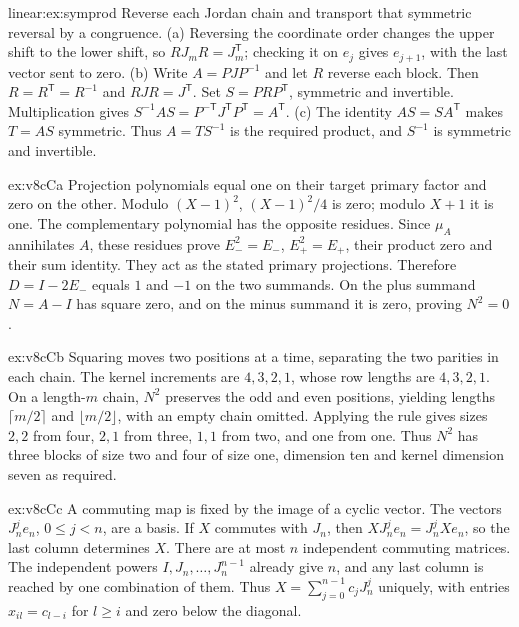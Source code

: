 \begin{solution}{linear:ex:symprod}
\idea Reverse each Jordan chain and transport that symmetric reversal by a congruence.
\writeup (a) Reversing the coordinate order changes the upper shift to the lower shift, so $RJ_mR=J_m^{\mathsf T}$; checking it on $e_j$ gives $e_{j+1}$, with the last vector sent to zero. (b) Write $A=PJP^{-1}$ and let $R$ reverse each block. Then $R=R^{\mathsf T}=R^{-1}$ and $RJR=J^{\mathsf T}$. Set $S=PRP^{\mathsf T}$, symmetric and invertible. Multiplication gives $S^{-1}AS=P^{-\mathsf T}J^{\mathsf T}P^{\mathsf T}=A^{\mathsf T}$. (c) The identity $AS=SA^{\mathsf T}$ makes $T=AS$ symmetric. Thus $A=TS^{-1}$ is the required product, and $S^{-1}$ is symmetric and invertible.
\end{solution}
\begin{solution}{ex:v8cCa}
\idea Projection polynomials equal one on their target primary factor and zero on the other.
\writeup Modulo $(X-1)^2$, $(X-1)^2/4$ is zero; modulo $X+1$ it is one. The complementary polynomial has the opposite residues. Since $\mu_A$ annihilates $A$, these residues prove $E_-^2=E_-$, $E_+^2=E_+$, their product zero and their sum identity. They act as the stated primary projections. Therefore $D=I-2E_-$ equals $1$ and $-1$ on the two summands. On the plus summand $N=A-I$ has square zero, and on the minus summand it is zero, proving $N^2=0$.
\end{solution}
\begin{solution}{ex:v8cCb}
\idea Squaring moves two positions at a time, separating the two parities in each chain.
\writeup The kernel increments are $4,3,2,1$, whose row lengths are $4,3,2,1$. On a length-$m$ chain, $N^2$ preserves the odd and even positions, yielding lengths $\lceil m/2\rceil$ and $\lfloor m/2\rfloor$, with an empty chain omitted. Applying the rule gives sizes $2,2$ from four, $2,1$ from three, $1,1$ from two, and one from one. Thus $N^2$ has three blocks of size two and four of size one, dimension ten and kernel dimension seven as required.
\end{solution}
\begin{solution}{ex:v8cCc}
\idea A commuting map is fixed by the image of a cyclic vector.
\writeup The vectors $J_n^je_n$, $0\le j<n$, are a basis. If $X$ commutes with $J_n$, then $XJ_n^je_n=J_n^jXe_n$, so the last column determines $X$. There are at most $n$ independent commuting matrices. The independent powers $I,J_n,\ldots,J_n^{n-1}$ already give $n$, and any last column is reached by one combination of them. Thus $X=\sum_{j=0}^{n-1}c_jJ_n^j$ uniquely, with entries $x_{il}=c_{l-i}$ for $l\ge i$ and zero below the diagonal.
\end{solution}
